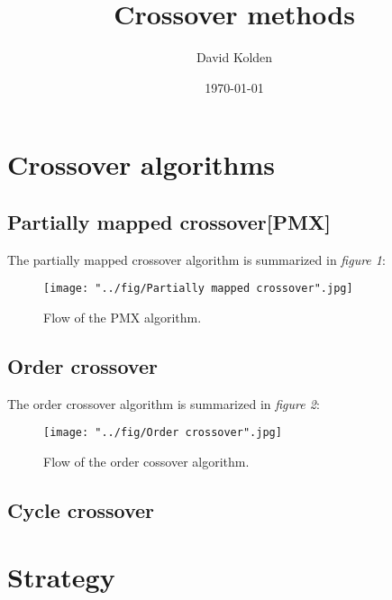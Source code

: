 \documentclass{article}
\author{David Kolden}
\title{Crossover methods}
\date{\today}
\begin{document}
\maketitle
\tableofcontents
\newpage
\section{Crossover algorithms}
\subsection{Partially mapped crossover[PMX]}
The partially mapped crossover algorithm is summarized in \textit{figure 1}:\\
\begin{figure}[H]
\begin{center}
\texttt{[image: "../fig/Partially mapped crossover".jpg]}
\caption{Flow of the PMX algorithm.}
\label{fig:w1e1b}
\end{center}
\end{figure}
\newpage
\subsection{Order crossover}
The order crossover algorithm is summarized in \textit{figure 2}:\\
\begin{figure}[H]
\begin{center}
\texttt{[image: "../fig/Order crossover".jpg]}
\caption{Flow of the order cossover algorithm.}
\label{fig:w1e1b}
\end{center}
\end{figure}
\subsection{Cycle crossover}
\section{Strategy}
\end{document}

